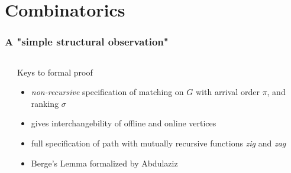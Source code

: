 \documentclass{beamer}
\begin{document}
\section{Combinatorics}
\begin{frame}
  \frametitle{A "simple structural observation"}
  \begin{columns}
    \begin{column}{.3\textwidth}
    \end{column}
    \begin{column}{.65\textwidth}
      \begin{alertblock}{Keys to formal proof}
        \begin{itemize}
          \item<3-> \emph{non-recursive} specification of matching on $G$ with arrival order $\pi$,
          and ranking $\sigma$
          \item<4-> gives interchangebility of offline and online vertices
          \item<5-> full specification of path with mutually recursive functions \emph{zig} and \emph{zag}
          \item<6-> Berge's Lemma formalized by Abdulaziz~\cite{abdulaziz2019}
        \end{itemize}
      \end{alertblock}
    \end{column}
  \end{columns}
  

\end{frame}
\end{document}
